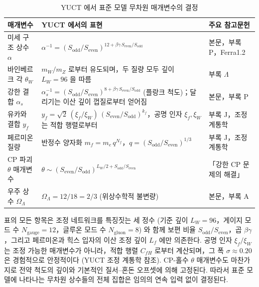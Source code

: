 \documentclass[12pt,a4paper]{article}
\begin{document}
	\begin{table}[htbp]
		\centering
		\caption{YUCT 에서 표준 모델 무차원 매개변수의 결정}
		\label{tab:SMparams}
		\small
		\begin{tabular}{@{}p{3.0cm} p{5.2cm} p{5.2cm}@{}}
			\toprule
			\textbf{매개변수} & \textbf{YUCT 에서의 표현} & \textbf{주요 참고문헌} \\
			\midrule
			미세 구조 상수 \(\alpha\) &
			\(\alpha^{-1} = (S_{\mathrm{odd}}/S_{\mathrm{even}})^{12+\beta\gamma\,S_{\mathrm{even}}/S_{\mathrm{odd}}}\) &
			본문，부록 P，Ferra1.2 \\
			바인베르크 각 \(\theta_W\) &
			\(m_W/m_Z\) 로부터 유도되며，두 질량 모두 깊이 \(L_W=96\) 을 따름 &
			부록 \(\Lambda\) \\
			강한 결합 \(\alpha_s\) &
			\(\alpha_s^{-1} = (S_{\mathrm{odd}}/S_{\mathrm{even}})^{8+\beta\gamma\,S_{\mathrm{even}}/S_{\mathrm{odd}}}\) (플랑크 척도)；달리기는 이산 깊이 껍질로부터 얻어짐 &
			본문，부록 P \\
			유카와 결합 \(y_f\) &
			\(y_f = \sqrt{2}\,(\xi_f/\xi_W)\,(S_{\mathrm{even}}/S_{\mathrm{odd}})^{k_f}\)，공명 인자 \(\xi_f,\xi_W\) 는 적합 행렬로부터 &
			부록 J，조정 계통학 \\
			페르미온 질량 & 반정수 양자화 \(m_f = m_e\,q^{N_f}\)，\(q=(S_{\mathrm{odd}}/S_{\mathrm{even}})^{1/3}\) &
			부록 J，조정 계통학 \\
			CP 파괴 \(\theta\) 매개변수 &
			\(\theta \sim (S_{\mathrm{even}}/S_{\mathrm{odd}})^{L_W/2 + S_{\mathrm{odd}}/S_{\mathrm{even}}}\) &
			「강한 CP 문제의 해결」 \\
			우주 상수 \(\Omega_\Lambda\) &
			\(\Omega_\Lambda = 12/18 = 2/3\) (위상수학적 불변량) &
			본문，부록 A \\
			\bottomrule
		\end{tabular}
	\end{table}
	
	표의 모든 항목은 조정 네트워크를 특징짓는 세 정수 (기준 깊이 \(L_W=96\)，게이지 모드 수 \(N_{\mathrm{gauge}}=12\)，글루온 모드 수 \(N_{\mathrm{gluon}}=8\)) 와 함께 보편 비율 \(S_{\mathrm{odd}}/S_{\mathrm{even}}\)，곱 \(\beta\gamma\)，그리고 페르미온과 힉스 입자의 이산 조정 깊이 \(L_f\) 에만 의존한다. 공명 인자 \(\xi_f/\xi_W\) 는 조정 가능한 매개변수가 아니라，적합 행렬 \(C_{fH}\) 로부터 계산되며，그 폭 \(\sigma \approx 0.20\) 은 경험적으로 안정적이다 (YUCT 조정 계통학 참조). CP-홀수 \(\theta\) 매개변수도 마찬가지로 전약 척도의 깊이와 기본적인 질서–혼돈 오프셋에 의해 고정된다. 따라서 표준 모델에 나타나는 무차원 상수들의 전체 집합은 임의의 연속 입력 없이 결정된다.
	
\end{document}
